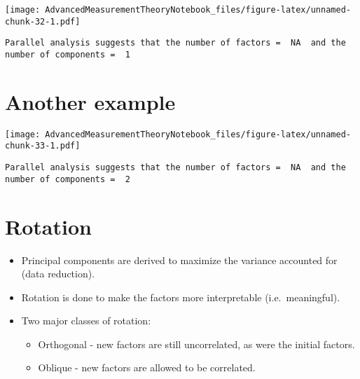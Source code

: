 \documentclass[
]{book}
\newenvironment{Shaded}{\begin{snugshade}}{\end{snugshade}}
\newcommand{\AttributeTok}[1]{\textcolor[rgb]{0.77,0.63,0.00}{#1}}
\newcommand{\FunctionTok}[1]{\textcolor[rgb]{0.00,0.00,0.00}{#1}}
\newcommand{\NormalTok}[1]{#1}
\newcommand{\SpecialCharTok}[1]{\textcolor[rgb]{0.00,0.00,0.00}{#1}}
\newcommand{\StringTok}[1]{\textcolor[rgb]{0.31,0.60,0.02}{#1}}
\providecommand{\tightlist}{%
  \setlength{\itemsep}{0pt}\setlength{\parskip}{0pt}}
\begin{document}
\texttt{[image: AdvancedMeasurementTheoryNotebook\_files/figure-latex/unnamed-chunk-32-1.pdf]}

\begin{verbatim}
Parallel analysis suggests that the number of factors =  NA  and the number of components =  1 
\end{verbatim}

\hypertarget{another-example}{%
\section{Another example}\label{another-example}}

\begin{Shaded}
\end{Shaded}

\texttt{[image: AdvancedMeasurementTheoryNotebook\_files/figure-latex/unnamed-chunk-33-1.pdf]}

\begin{verbatim}
Parallel analysis suggests that the number of factors =  NA  and the number of components =  2 
\end{verbatim}

\hypertarget{rotation}{%
\section{Rotation}\label{rotation}}

\begin{itemize}
\tightlist
\item
  Principal components are derived to maximize the variance accounted for (data reduction).
\item
  Rotation is done to make the factors more interpretable (i.e.~meaningful).
\item
  Two major classes of rotation:

  \begin{itemize}
  \tightlist
  \item
    Orthogonal - new factors are still uncorrelated, as were the initial factors.
  \item
    Oblique - new factors are allowed to be correlated.
  \end{itemize}
\end{itemize}
\end{document}
